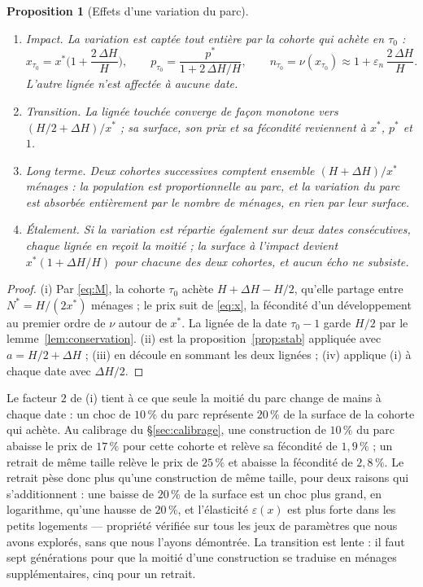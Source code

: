 \documentclass[11pt,a4paper]{article}
\theoremstyle{plain}
\newtheorem{proposition}{Proposition}
\theoremstyle{definition}
\newcommand{\eps}{\varepsilon}
\begin{document}
\begin{proposition}[Effets d'une variation du parc]\label{prop:choc}
\begin{enumerate}
\item[(i)] \emph{Impact.} La variation est captée tout entière par la cohorte qui achète en $\tau_0$ :
\[
x_{\tau_0} = x^*\Big(1 + \frac{2\,\Delta H}{H}\Big), \qquad
p_{\tau_0} = \frac{p^*}{1 + 2\,\Delta H/H}, \qquad
n_{\tau_0} = \nu(x_{\tau_0}) \approx 1 + \eps_n\,\frac{2\,\Delta H}{H} .
\]
L'autre lignée n'est affectée à aucune date.
\item[(ii)] \emph{Transition.} La lignée touchée converge de façon monotone vers $(H/2 + \Delta H)/x^*$ ; sa surface, son prix et sa fécondité reviennent à $x^*$, $p^*$ et $1$.
\item[(iii)] \emph{Long terme.} Deux cohortes successives comptent ensemble $(H + \Delta H)/x^*$ ménages : la population est proportionnelle au parc, et la variation du parc est absorbée entièrement par le nombre de ménages, en rien par leur surface.
\item[(iv)] \emph{Étalement.} Si la variation est répartie également sur deux dates consécutives, chaque lignée en reçoit la moitié ; la surface à l'impact devient $x^*(1 + \Delta H/H)$ pour chacune des deux cohortes, et aucun écho ne subsiste.
\end{enumerate}
\end{proposition}
\begin{proof}
(i) Par \eqref{eq:M}, la cohorte $\tau_0$ achète $H + \Delta H - H/2$, qu'elle partage entre $N^* = H/(2x^*)$ ménages ; le prix suit de \eqref{eq:x}, la fécondité d'un développement au premier ordre de $\nu$ autour de $x^*$. La lignée de la date $\tau_0 - 1$ garde $H/2$ par le lemme~\ref{lem:conservation}. (ii) est la proposition~\ref{prop:stab} appliquée avec $a = H/2 + \Delta H$ ; (iii) en découle en sommant les deux lignées ; (iv) applique (i) à chaque date avec $\Delta H/2$.
\end{proof}

Le facteur $2$ de (i) tient à ce que seule la moitié du parc change de mains à chaque date : un choc de $10\,\%$ du parc représente $20\,\%$ de la surface de la cohorte qui achète. Au calibrage du §\ref{sec:calibrage}, une construction de $10\,\%$ du parc abaisse le prix de $17\,\%$ pour cette cohorte et relève sa fécondité de $1{,}9\,\%$ ; un retrait de même taille relève le prix de $25\,\%$ et abaisse la fécondité de $2{,}8\,\%$. Le retrait pèse donc plus qu'une construction de même taille, pour deux raisons qui s'additionnent : une baisse de $20\,\%$ de la surface est un choc plus grand, en logarithme, qu'une hausse de $20\,\%$, et l'élasticité $\eps(x)$ est plus forte dans les petits logements — propriété vérifiée sur tous les jeux de paramètres que nous avons explorés, sans que nous l'ayons démontrée. La transition est lente : il faut sept générations pour que la moitié d'une construction se traduise en ménages supplémentaires, cinq pour un retrait.
\end{document}
